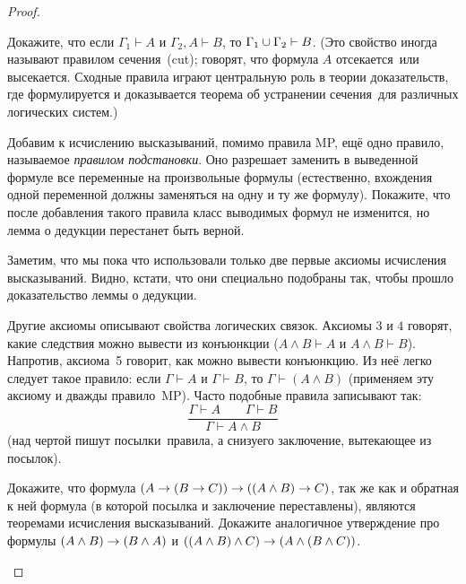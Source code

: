 \begin{proof}
\begin{problem}
Докажите, что если $\Gamma_1\vdash A$ и $\Gamma_2,A\vdash B$, то
$\Gamma_1\hm\cup\Gamma_2\hm\vdash B$. (Это свойство иногда называют
 правилом сечения\ (cut);%
говорят, что формула $A$
 отсекается\ или  высекается.
Сходные правила играют центральную роль в теории
доказательств, где формулируется и доказывается  теорема об
устранении сечения\ для различных логических систем.)
\end{problem}

\begin{problem}
Добавим к исчислению высказываний, помимо правила MP,
ещё одно правило, называемое \emph{правилом подстановки}.%
%
Оно разрешает заменить в выведенной формуле все переменные на
произвольные формулы (естественно, вхождения одной переменной
должны заменяться на одну и ту же формулу). Покажите, что после
добавления такого правила класс выводимых формул не изменится,
но лемма о дедукции перестанет быть верной.
\end{problem}

Заметим, что мы пока что использовали только две первые аксиомы
исчисления высказываний. Видно, кстати, что они специально
подобраны так, чтобы прошло доказательство леммы о дедукции.

Другие аксиомы описывают свойства логических связок. Аксиомы $3$
и $4$ говорят, какие следствия можно вывести из конъюнкции
($A\land B \vdash A$ и $A\land B \vdash B$). Напротив, аксиома~5
говорит, как можно вывести конъюнкцию. Из неё легко следует
такое правило: если $\Gamma\vdash A$ и $\Gamma\vdash B$, то
$\Gamma\vdash(A\land B)$ (применяем эту аксиому и дважды правило~MP).
Часто подобные правила записывают так:
        $$
\frac{\Gamma\vdash A \qquad \Gamma\vdash B}{\Gamma\vdash A\land B}
        $$
(над чертой пишут  посылки\ правила, а снизу\т его 
заключение, вытекающее из посылок).

\begin{problem}
Докажите, что формула $(A\hm\to{(B\to C)})\hm\to ({(A\land
B)}\hm\to C)$, так же как и обратная к ней формула (в которой
посылка и заключение переставлены), являются теоремами
исчисления высказываний. Докажите аналогичное утверждение про
формулы ${(A\land B)}\hm\to{(B\land A)}$ и $((A\land B)\land C)\hm\to
(A\hm\land{(B\land C)})$.
\end{problem}


\end{proof}
